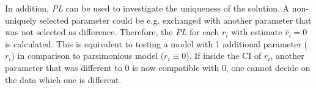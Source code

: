 \documentclass{bioinfo}
\begin{document}
In addition, \emph{PL} can be used to investigate the uniqueness of the solution.
A non-uniquely selected parameter could be e.g. exchanged with another parameter that was not selected as difference.
Therefore, the \emph{PL} for each $r_i$ with estimate $\hat r_i=0$ is calculated.
This is equivalent to testing a model with 1 additional parameter ($r_i$) in comparison to parsimonious model ($r_i \equiv 0$).
If inside the CI of $r_i$, another parameter that was different to $0$ is now compatible with $0$, one cannot decide on the data which one is different.

\end{document}
